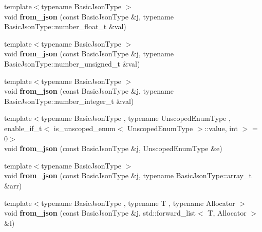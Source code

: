 \begin{DoxyCompactItemize}
\item 
\mbox{\label{namespacenlohmann_1_1detail_a7cb5dd7d46a60e65f9a8e0873b3f7dd8}} 
{\footnotesize template$<$typename Basic\+Json\+Type $>$ }\\void {\bfseries from\+\_\+json} (const Basic\+Json\+Type \&j, typename Basic\+Json\+Type\+::number\+\_\+float\+\_\+t \&val)
\item 
\mbox{\label{namespacenlohmann_1_1detail_ace4d5680ba413d9fd897ccb5d9c61a1c}} 
{\footnotesize template$<$typename Basic\+Json\+Type $>$ }\\void {\bfseries from\+\_\+json} (const Basic\+Json\+Type \&j, typename Basic\+Json\+Type\+::number\+\_\+unsigned\+\_\+t \&val)
\item 
\mbox{\label{namespacenlohmann_1_1detail_a047d881e611fcac709dc318f730a1732}} 
{\footnotesize template$<$typename Basic\+Json\+Type $>$ }\\void {\bfseries from\+\_\+json} (const Basic\+Json\+Type \&j, typename Basic\+Json\+Type\+::number\+\_\+integer\+\_\+t \&val)
\item 
\mbox{\label{namespacenlohmann_1_1detail_acf8dd944c2c7455880dee6f0b355aa01}} 
{\footnotesize template$<$typename Basic\+Json\+Type , typename Unscoped\+Enum\+Type , enable\+\_\+if\+\_\+t$<$ is\+\_\+unscoped\+\_\+enum$<$ Unscoped\+Enum\+Type $>$\+::value, int $>$  = 0$>$ }\\void {\bfseries from\+\_\+json} (const Basic\+Json\+Type \&j, Unscoped\+Enum\+Type \&e)
\item 
\mbox{\label{namespacenlohmann_1_1detail_abc62958462b916726b89f25fa381a129}} 
{\footnotesize template$<$typename Basic\+Json\+Type $>$ }\\void {\bfseries from\+\_\+json} (const Basic\+Json\+Type \&j, typename Basic\+Json\+Type\+::array\+\_\+t \&arr)
\item 
\mbox{\label{namespacenlohmann_1_1detail_a7fb5b5b8034d347b702d31d7fec4ecd7}} 
{\footnotesize template$<$typename Basic\+Json\+Type , typename T , typename Allocator $>$ }\\void {\bfseries from\+\_\+json} (const Basic\+Json\+Type \&j, std\+::forward\+\_\+list$<$ T, Allocator $>$ \&l)

\end{DoxyCompactItemize}
